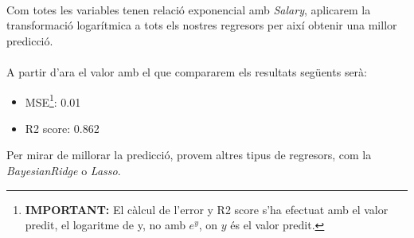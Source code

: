 \documentclass[a4paper, 11pt]{article}
\begin{document}
\\
Com totes les variables tenen relació exponencial amb \textit{Salary}, aplicarem la transformació logarítmica a tots els nostres regresors per així obtenir una millor predicció.\\\\
A partir d'ara el valor amb el que compararem els resultats següents serà:
\begin{itemize}
    \item MSE\footnote{\textbf{IMPORTANT:} El càlcul de l'error y R2 score s'ha efectuat amb el valor predit, el logaritme de y, no amb $e^y$, on $y$ és el valor predit.}: 0.01
    \item R2 score: 0.862
\end{itemize}
Per mirar de millorar la predicció, provem altres tipus de regresors, com la \textit{BayesianRidge} o \textit{Lasso}.
\newpage
\end{document}
